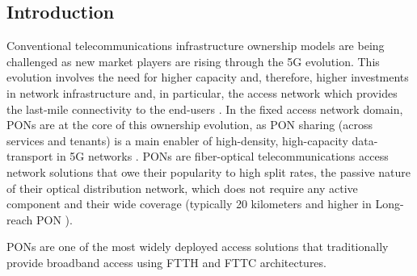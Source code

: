 \subsection{Introduction}
Conventional telecommunications infrastructure ownership models are being challenged as new market players are rising through the 5G evolution. This evolution involves the need for higher capacity and, therefore, higher investments in network infrastructure and, in particular, the access network which provides the last-mile connectivity to the end-users \cite{Nima-5g-evol}.
In the fixed access network domain, \acp{PON} are at the core of this ownership evolution, as \ac{PON} sharing (across services and tenants) is a main enabler of high-density, high-capacity data-transport in 5G networks \cite{8412589}. \acp{PON} are fiber-optical telecommunications access network solutions that owe their popularity to high split rates, the passive nature of their optical distribution network, which does not require any active component and their wide coverage (typically 20 kilometers and higher in Long-reach \ac{PON} \cite{7592399}). 

\acp{PON} are one of the most widely deployed access solutions that traditionally provide broadband access using \ac{FTTH} and \ac{FTTC} architectures. 





